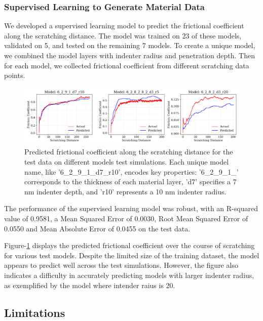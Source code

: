 \documentclass{article}
\begin{document}
\subsubsection{Supervised Learning to Generate Material Data}
We developed a supervised learning model to predict the frictional coefficient along the scratching distance.
The model was trained on 23 of these models, validated on 5, and tested on the remaining 7 models. To create a unique model, we combined the model layers with indenter radius and penetration depth. Then for each model, we collected frictional coefficient from different scratching data points.

\begin{figure}[!h]
    \begin{center}
        \includegraphics[scale=0.30]{figures/material_fric_pred.png}
    \end{center}
    \caption{Predicted frictional coefficient along the scratching distance for the test data on different models test simulations. Each unique model name, like '6\_2\_9\_1\_d7\_r10', encodes key properties: '6\_2\_9\_1\_' corresponds to the thickness of each material layer, 'd7' specifies a 7 nm indenter depth, and 'r10' represents a 10 nm indenter radius.}

    \label{fig:material_fric_pred}
\end{figure}

The performance of the supervised learning model was robust, with an R-squared value of 0.9581, a Mean Squared Error of 0.0030, Root Mean Squared Error of 0.0550 and Mean Absolute Error of 0.0455 on the test data.


Figure-\ref{fig:material_fric_pred} displays the predicted frictional coefficient over the course of scratching for various test models. Despite the limited size of the training dataset, the model appears to predict well across the test simulations. However, the figure also indicates a difficulty in accurately predicting models with larger indenter radius, as exemplified by the model where intender raius is 20.


\subsection{Limitations}
\end{document}
